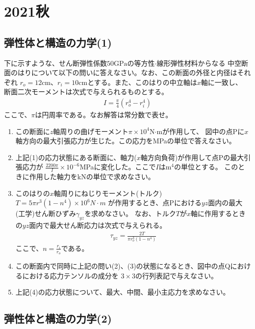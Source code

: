 \newpage
\section{2021秋}
\setcounter{yearcounter}{2021}

\subsection{弾性体と構造の力学(1)}

下に示すような、せん断弾性係数$50\text{GPa}$の等方性$\cdot$線形弾性材料からなる
中空断面のはりについて以下の問いに答えなさい。なお、この断面の外径と内径はそれぞれ
$r_o=12\text{cm}$、$r_i = 10\text{cm}$とする。また、このはりの中立軸は$x$軸に一致し、
断面二次モーメントは次式で与えられるものとする。
\begin{align*}%
  I = \frac{\pi}{4}(r_o^4 - r_i^4)
\end{align*}
ここで、$\pi$は円周率である。なお解答は常分数で表せ。

\begin{enumerate}[(1)]
  \item この断面に$z$軸周りの曲げモーメント$\pi \times10^4$N$\cdot$mが作用して、
        図中の点Pに$x$軸方向の最大引張応力が生じた。この応力をMPaの単位で答えなさい。
  \item 上記(1)の応力状態にある断面に、軸力($x$軸方向負荷)が作用して点Pの最大引張応力が
        $\frac{2200\pi}{I}\times 10^{-6}$MPaに変化した。ここで$I$は$\text{m}^4$の単位とする。
        このときに作用した軸力をkNの単位で求めなさい。
  \item このはりの$x$軸周りにねじりモーメント(トルク)$T = 5\pi r^3(1-n^4) \times 10^6 N \cdot m$
        が作用するとき、点Pにおける$yz$面内の最大(工学)せん断ひずみ$\gamma_{yz}$を求めなさい。
        なお、トルク$T$が$x$軸に作用するときの$yz$面内で最大せん断応力は次式で与えられる。
        \begin{align*}%
          \tau_{yz} = \frac{2T}{\pi r_o^3(1-n^4)}
        \end{align*}
        ここで、$n = \frac{r_i}{r_o}$である。
  \item この断面内で同時に上記の問い(2)、(3)の状態になるとき、図中の点Qにおけるにおける応力テンソルの成分を
        $3\times3$の行列表記で与えなさい。
  \item 上記(4)の応力状態について、最大、中間、最小主応力を求めなさい。
\end{enumerate}


\subsection{弾性体と構造の力学(2)}

